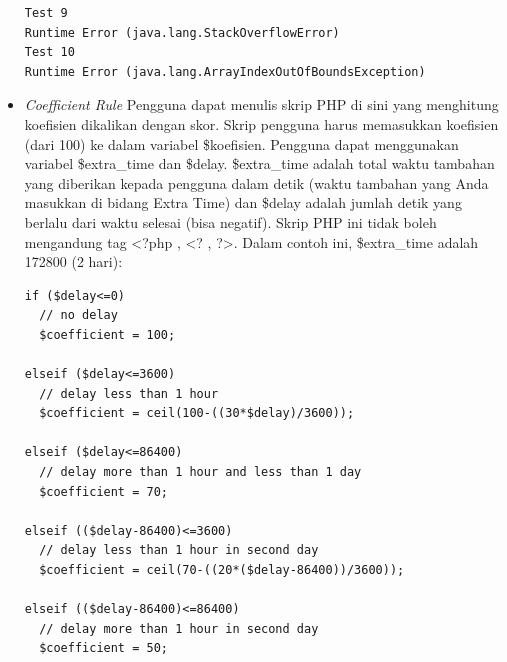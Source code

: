 \begin{itemize}
\begin{verbatim}
Test 9
Runtime Error (java.lang.StackOverflowError)
Test 10
Runtime Error (java.lang.ArrayIndexOutOfBoundsException)
        \end{verbatim}
        \item \textit{Coefficient Rule} \newline
        Pengguna dapat menulis skrip PHP di sini yang menghitung koefisien dikalikan dengan skor. Skrip pengguna harus memasukkan koefisien (dari 100) ke dalam variabel \$koefisien. Pengguna dapat menggunakan variabel \$extra\_time dan \$delay. \$extra\_time adalah total waktu tambahan yang diberikan kepada pengguna dalam detik (waktu tambahan yang Anda masukkan di bidang Extra Time) dan \$delay adalah jumlah detik yang berlalu dari waktu selesai (bisa negatif). Skrip PHP ini tidak boleh mengandung tag <?php , <? , ?>. Dalam contoh ini, \$extra\_time adalah 172800 (2 hari): 
        \begin{verbatim}
if ($delay<=0)
  // no delay
  $coefficient = 100;

elseif ($delay<=3600)
  // delay less than 1 hour
  $coefficient = ceil(100-((30*$delay)/3600));

elseif ($delay<=86400)
  // delay more than 1 hour and less than 1 day
  $coefficient = 70;

elseif (($delay-86400)<=3600)
  // delay less than 1 hour in second day
  $coefficient = ceil(70-((20*($delay-86400))/3600));

elseif (($delay-86400)<=86400)
  // delay more than 1 hour in second day
  $coefficient = 50;


\end{verbatim}
\end{itemize}
